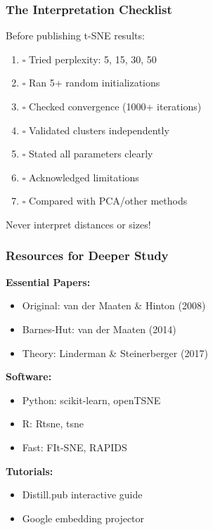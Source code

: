\documentclass[aspectratio=169]{beamer}
\begin{document}
\begin{frame}
\frametitle{The Interpretation Checklist}

Before publishing t-SNE results:

\begin{enumerate}
\item $\square$ Tried perplexity: 5, 15, 30, 50
\item $\square$ Ran 5+ random initializations
\item $\square$ Checked convergence (1000+ iterations)
\item $\square$ Validated clusters independently
\item $\square$ Stated all parameters clearly
\item $\square$ Acknowledged limitations
\item $\square$ Compared with PCA/other methods
\end{enumerate}

\vspace{0.3cm}
\colorbox{yellow!20}{Never interpret distances or sizes!}

\end{frame}

\begin{frame}
\frametitle{Resources for Deeper Study}

\textbf{Essential Papers:}
\begin{itemize}
\item Original: van der Maaten \& Hinton (2008)
\item Barnes-Hut: van der Maaten (2014)
\item Theory: Linderman \& Steinerberger (2017)
\end{itemize}

\textbf{Software:}
\begin{itemize}
\item Python: scikit-learn, openTSNE
\item R: Rtsne, tsne
\item Fast: FIt-SNE, RAPIDS
\end{itemize}

\textbf{Tutorials:}
\begin{itemize}
\item Distill.pub interactive guide
\item Google embedding projector
\end{itemize}

\end{frame}
\end{document}
